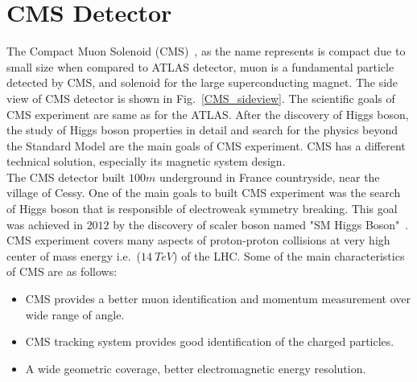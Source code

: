 \section{CMS Detector}
The Compact Muon Solenoid (CMS)~\cite{Collaboration_2008cms}, as the name represents is compact due to small size when compared to ATLAS detector, muon is a fundamental particle detected by CMS, and solenoid for the large superconducting magnet. The side view of CMS detector is shown in Fig.~\ref{CMS_sideview}. The scientific goals of CMS experiment are same as for the ATLAS. After the discovery of Higgs boson, the study of Higgs boson properties in detail and search for the physics beyond the Standard Model are the main goals of CMS experiment. CMS has a different technical solution, especially its magnetic system design.\\
The CMS detector built $100m$ underground in France countryside, near the village of Cessy. One of the main goals to built CMS experiment was the search of Higgs boson that is responsible of electroweak symmetry breaking. This goal was achieved in $2012$ by the discovery of scaler boson named "SM Higgs Boson"~\cite{Chatrchyan_2012}. CMS experiment covers many aspects of proton-proton collisions at very high center of mass energy i.e.~($14~TeV$) of the LHC. 
Some of the main characteristics of CMS are as follows:
\begin{itemize}
\item CMS provides a better muon identification and momentum measurement over wide range of angle.
\item CMS tracking system provides good identification of the charged particles.
\item A wide geometric coverage, better electromagnetic energy resolution.
\end{itemize}
